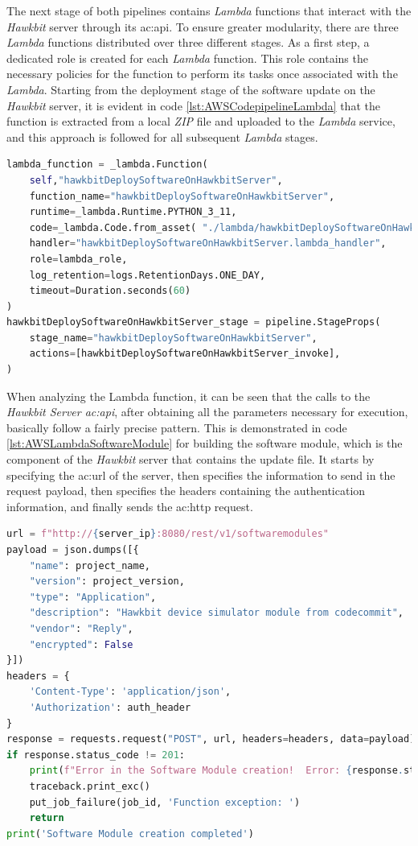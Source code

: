 The next stage of both pipelines contains \textit{Lambda} functions that interact with the \textit{Hawkbit} server through its \gls{ac:api}. To ensure greater modularity, there are three \textit{Lambda} functions distributed over three different stages. As a first step, a dedicated role is created for each \textit{Lambda} function. This role contains the necessary policies for the function to perform its tasks once associated with the \textit{Lambda}.
Starting from the deployment stage of the software update on the \textit{Hawkbit} server, it is evident in code \ref{lst:AWSCodepipelineLambda} that the function is extracted from a local \textit{ZIP} file and uploaded to the \textit{Lambda} service, and this approach is followed for all subsequent \textit{Lambda} stages.
\begin{lstlisting}[language=Python, caption={\textit{CDK} code for the deploy software on \textit{Hawkbit} server \textit{Lambda} creation}, label=lst:AWSCodepipelineLambda]
lambda_function = _lambda.Function(
    self,"hawkbitDeploySoftwareOnHawkbitServer",
    function_name="hawkbitDeploySoftwareOnHawkbitServer",
    runtime=_lambda.Runtime.PYTHON_3_11,
    code=_lambda.Code.from_asset( "./lambda/hawkbitDeploySoftwareOnHawkbitServer.zip"),
    handler="hawkbitDeploySoftwareOnHawkbitServer.lambda_handler",
    role=lambda_role,
    log_retention=logs.RetentionDays.ONE_DAY,
    timeout=Duration.seconds(60)
)
hawkbitDeploySoftwareOnHawkbitServer_stage = pipeline.StageProps(
    stage_name="hawkbitDeploySoftwareOnHawkbitServer",
    actions=[hawkbitDeploySoftwareOnHawkbitServer_invoke],
)
\end{lstlisting}

When analyzing the Lambda function, it can be seen that the calls to the \textit{Hawkbit Server \gls{ac:api}}, after obtaining all the parameters necessary for execution, basically follow a fairly precise pattern. This is demonstrated in code \ref{lst:AWSLambdaSoftwareModule} for building the software module, which is the component of the \textit{Hawkbit} server that contains the update file. It starts by specifying the \gls{ac:url} of the server, then specifies the information to send in the request payload, then specifies the headers containing the authentication information, and finally sends the \gls{ac:http} request.
\begin{lstlisting}[language=Python, caption={\textit{Lambda} code for the software module creation}, label=lst:AWSLambdaSoftwareModule]
url = f"http://{server_ip}:8080/rest/v1/softwaremodules"
payload = json.dumps([{
    "name": project_name,
    "version": project_version,
    "type": "Application",
    "description": "Hawkbit device simulator module from codecommit",
    "vendor": "Reply",
    "encrypted": False
}])
headers = {
    'Content-Type': 'application/json',
    'Authorization': auth_header
}
response = requests.request("POST", url, headers=headers, data=payload)
if response.status_code != 201:
    print(f"Error in the Software Module creation!  Error: {response.status_code}")
    traceback.print_exc()
    put_job_failure(job_id, 'Function exception: ')
    return
print('Software Module creation completed')
\end{lstlisting}

